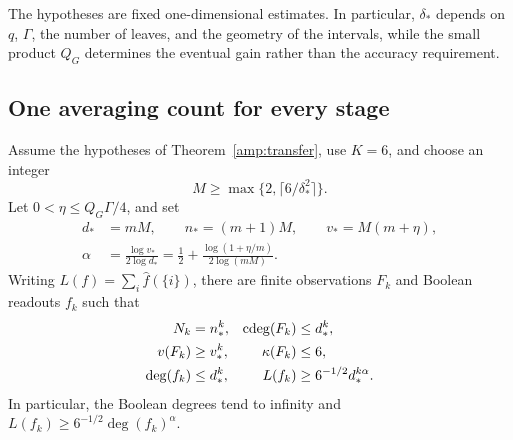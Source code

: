 The hypotheses are fixed one-dimensional estimates.  In particular,
$\delta_*$ depends on $q$, $\Gamma$, the number of leaves, and the
geometry of the intervals, while the small product $Q_G$ determines
the eventual gain rather than the accuracy requirement.

\subsection{One averaging count for every stage}

\begin{theorem}
\label{amp:fixed-count}
Assume the hypotheses of Theorem~\ref{amp:transfer}, use $K=6$, and
choose an integer
\[
 M\ge\max\{2,\lceil6/\delta_*^2\rceil\}.
\]
Let $0<\eta\le Q_G\Gamma/4$, and set
\begin{equation}
 \begin{aligned}
 d_*&=mM,\qquad n_*=(m+1)M,\qquad v_*=M(m+\eta),\\
 \alpha&=\frac{\log v_*}{2\log d_*}
       =\frac12+\frac{\log(1+\eta/m)}{2\log(mM)}.
 \end{aligned}
 \label{amp:scales}
\end{equation}
Writing $L(f)=\sum_i\widehat f(\{i\})$, there are finite observations
$F_k$ and Boolean readouts $f_k$ such that
\begin{align}
 N_k&=n_*^k,& \operatorname{cdeg}(F_k)&\le d_*^k,\notag\\
 v(F_k)&\ge v_*^k,& \kappa(F_k)&\le6,\notag\\
 \deg(f_k)&\le d_*^k,& L(f_k)&\ge6^{-1/2}d_*^{k\alpha}.
 \label{amp:iterates}
\end{align}
In particular, the Boolean degrees tend to infinity and
$L(f_k)\ge6^{-1/2}\deg(f_k)^\alpha$.
\end{theorem}

